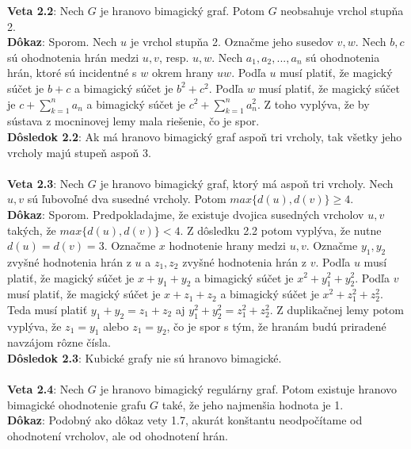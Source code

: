 \documentclass[12pt]{article}
\begin{document}
\textbf{Veta 2.2}: Nech $G$ je hranovo bimagický graf. Potom $G$ neobsahuje vrchol stupňa 2. \\

\textbf{Dôkaz}: Sporom. Nech $u$ je vrchol stupňa 2. Označme jeho susedov $v,w$. Nech $b,c$ sú ohodnotenia hrán medzi $u,v$, resp. $u,w$. Nech $a_1, a_2, ... , a_n$ sú ohodnotenia hrán, ktoré sú incidentné s $w$ okrem hrany $uw$. Podľa $u$ musí platiť, že magický súčet je $b+c$ a bimagický súčet je $b^2 + c^2$. Podľa $w$ musí platiť, že magický súčet je $c + \sum_{k=1}^{n} a_n$ a bimagický súčet je $c^2 + \sum_{k=1}^{n} a^2_n$. Z toho vyplýva, že by sústava z mocninovej lemy mala riešenie, čo je spor. \\

\textbf{Dôsledok 2.2}: Ak má hranovo bimagický graf aspoň tri vrcholy, tak všetky jeho vrcholy majú stupeň aspoň 3. \\\\

\textbf{Veta 2.3}: Nech $G$ je hranovo bimagický graf, ktorý má aspoň tri vrcholy. Nech $u,v$ sú ľubovoľné dva susedné vrcholy. Potom $max \{d(u), d(v)\} \geq 4$. \\

\textbf{Dôkaz}: Sporom. Predpokladajme, že existuje dvojica susedných vrcholov $u,v$ takých, že $max \{d(u), d(v)\} < 4$. Z dôsledku 2.2 potom vyplýva, že nutne $d(u) = d(v) = 3$. Označme $x$ hodnotenie hrany medzi $u,v$. Označme $y_1, y_2$ zvyšné hodnotenia hrán z $u$ a $z_1, z_2$ zvyšné hodnotenia hrán z $v$. Podľa $u$ musí platiť, že magický súčet je $x + y_1 + y_2$ a bimagický súčet je $x^2 + y^2_1 + y^2_2$. Podľa $v$ musí platiť, že magický súčet je $x + z_1 + z_2$ a bimagický súčet je $x^2 + z^2_1 + z^2_2$. Teda musí platiť $y_1 + y_2 = z_1 + z_2$ aj $y^2_1 + y^2_2 = z^2_1 + z^2_2$. Z duplikačnej lemy potom vyplýva, že $z_1 = y_1$ alebo $z_1 = y_2$, čo je spor s tým, že hranám budú priradené navzájom rôzne čísla.  \\

\textbf{Dôsledok 2.3}: Kubické grafy nie sú hranovo bimagické. \\\\

\textbf{Veta 2.4}: Nech $G$ je hranovo bimagický regulárny graf. Potom existuje hranovo bimagické ohodnotenie grafu $G$ také, že jeho najmenšia hodnota je 1. \\

\textbf{Dôkaz}: Podobný ako dôkaz vety 1.7, akurát konštantu neodpočítame od ohodnotení vrcholov, ale od ohodnotení hrán. \\\\
\end{document}
